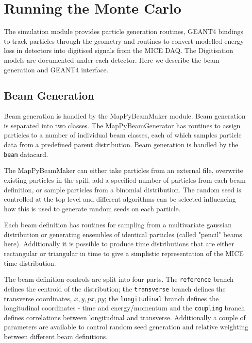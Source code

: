 \chapter{Running the Monte Carlo}
\label{chapter:simulation}
The simulation module provides particle generation routines, GEANT4 bindings to track particles through the geometry and routines to convert modelled energy loss in detectors into digitised signals from the MICE DAQ. The Digitisation models are documented under each detector. Here we describe the beam generation and GEANT4 interface.

\section{Beam Generation}
Beam generation is handled by the MapPyBeamMaker module. Beam generation is separated into two classes. The MapPyBeamGenerator has routines to assign particles to a number of individual beam classes, each of which samples particle data from a predefined parent distribution. Beam generation is handled by the \verb|beam| datacard.

The MapPyBeamMaker can either take particles from an external file, overwrite existing particles in the spill, add a specified number of particles from each beam definition, or sample particles from a binomial distribution. The random seed is controlled at the top level and different algorithms can be selected influencing how this is used to generate random seeds on each particle. 

Each beam definition has routines for sampling from a multivariate gaussian distribution or generating ensembles of identical particles (called "pencil" beams here). Additionally it is possible to produce time distributions that are either rectangular or triangular in time to give a simplistic representation of the MICE time distribution.

The beam definition controls are split into four parts. The \verb|reference| branch defines the centroid of the distribution; the \verb|transverse| branch defines the transverse coordinates, $x, y, px, py$; the \verb|longitudinal| branch defines the longitudinal coordinates - time and energy/momentum and the \verb|coupling| branch defines correlations between longitudinal and transverse. Additionally a couple of parameters are available to control random seed generation and relative weighting between different beam definitions.

